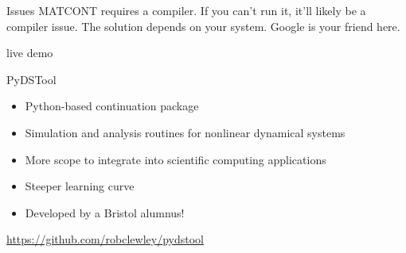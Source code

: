 \documentclass[presentation]{beamer}
\begin{document}
\begin{frame}[label={sec:orge9f3e7a}]{Issues}
MATCONT requires a compiler. If you can't run it, it'll likely be a compiler issue. The solution depends on your system. Google is your friend here.
\end{frame}

\begin{frame}[label={sec:org996a083},plain]{}
\begin{center}
live demo
\end{center}
\end{frame}

\begin{frame}[label={sec:org1f1c0bb}]{PyDSTool}
\begin{itemize}
\item Python-based continuation package
\item Simulation and analysis routines for nonlinear dynamical systems
\item More scope to integrate into scientific computing applications
\item Steeper learning curve
\item Developed by a Bristol alumnus!
\end{itemize}
\vfill    
\url{https://github.com/robclewley/pydstool}
\end{frame}
\end{document}
